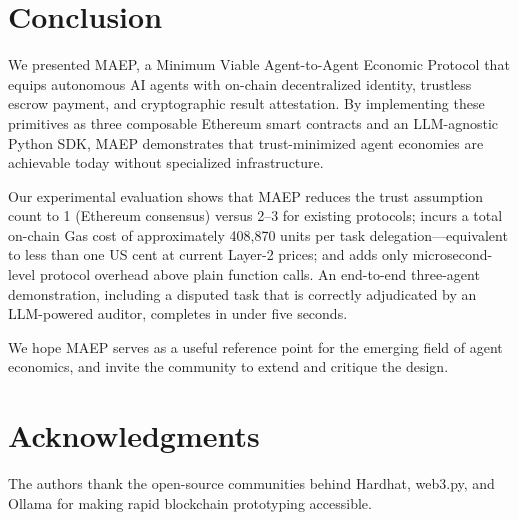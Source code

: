 \documentclass[conference]{IEEEtran}
\begin{document}
\section{Conclusion}
\label{sec:conclusion}

We presented MAEP, a Minimum Viable Agent-to-Agent Economic Protocol
that equips autonomous AI agents with on-chain decentralized identity,
trustless escrow payment, and cryptographic result attestation.  By
implementing these primitives as three composable Ethereum smart
contracts and an LLM-agnostic Python SDK, MAEP demonstrates that
trust-minimized agent economies are achievable today without
specialized infrastructure.

Our experimental evaluation shows that MAEP reduces the trust
assumption count to 1 (Ethereum consensus) versus 2--3 for existing
protocols; incurs a total on-chain Gas cost of approximately 408,870
units per task delegation---equivalent to less than one US cent at
current Layer-2 prices; and adds only microsecond-level protocol
overhead above plain function calls.  An end-to-end three-agent
demonstration, including a disputed task that is correctly adjudicated
by an LLM-powered auditor, completes in under five seconds.

We hope MAEP serves as a useful reference point for the emerging field
of agent economics, and invite the community to extend and critique the
design.

\section*{Acknowledgments}
The authors thank the open-source communities behind Hardhat, web3.py,
and Ollama for making rapid blockchain prototyping accessible.
\end{document}

